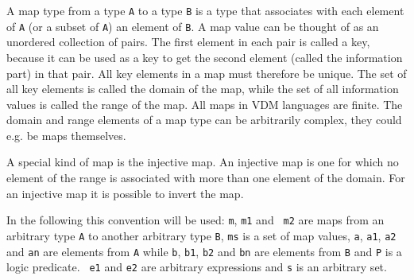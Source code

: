 \documentclass{overturerepchap}
\begin{document}
A map type from a type {\tt A} to a type {\tt B} is a type that
associates with each element of {\tt A} (or a subset of {\tt A}) an
element of {\tt B}.  A map value can be thought of as an unordered
collection of pairs.  The first element in each pair is called a key,
because it can be used as a key to get the second element (called the
information part) in that pair. All key elements in a map must therefore
be unique. The set of all key elements is called the domain of the map,
while the set of all information values is called the range of the map.
All maps in VDM languages are finite. The domain and range
elements of a map type can be arbitrarily complex, they could e.g. be
maps themselves.

A special kind of map is the injective map. An injective map is one
for which no element of the range is associated with more than one
element of the domain. For an injective map it is possible to invert
the map.

In the following this convention will be used: {\tt m}, {\tt m1} and {\tt
  m2} are maps from an arbitrary type {\tt A} to another arbitrary type
{\tt B}, {\tt ms} is a set of map values, {\tt a}, {\tt a1}, {\tt a2} and
{\tt an} are elements from {\tt A} while {\tt b}, {\tt b1}, {\tt b2} and
{\tt bn} are elements from {\tt B} and {\tt P} is a logic predicate. {\tt
  e1} and {\tt e2} are arbitrary expressions and {\tt s} is an arbitrary
set.
\end{document}
